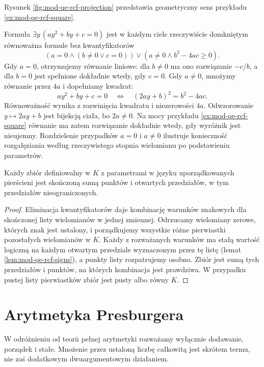 Rysunek \ref{fig:mod-qe-rcf-projection} przedstawia
geometryczny sens przykładu \ref{ex:mod-qe-rcf-square}.

\begin{przyklad}
\label{ex:mod-qe-rcf-quadratic}
Formuła $\exists y\,(ay^2+by+c=0)$ jest w każdym
ciele rzeczywiście domkniętym równoważna formule
bez kwantyfikatorów
\[
(a=0\land (b\ne0\lor c=0))
\lor(a\ne0\land b^2-4ac\geq0).
\]
Gdy $a=0$, otrzymujemy równanie liniowe: dla $b\ne0$
ma ono rozwiązanie $-c/b$, a dla $b=0$ jest spełnione
dokładnie wtedy, gdy $c=0$. Gdy $a\ne0$, mnożymy
równanie przez $4a$ i dopełniamy kwadrat:
\[
ay^2+by+c=0
\quad\Longleftrightarrow\quad
(2ay+b)^2=b^2-4ac.
\]
Równoważność wynika z rozwinięcia kwadratu i
niezerowości $4a$. Odwzorowanie $y\mapsto 2ay+b$
jest bijekcją ciała, bo $2a\ne0$. Na mocy przykładu
\ref{ex:mod-qe-rcf-square} równanie ma zatem
rozwiązanie dokładnie wtedy, gdy wyróżnik jest
nieujemny. Rozdzielenie przypadków $a=0$ i $a\ne0$
ilustruje konieczność rozgałęziania według rzeczywistego
stopnia wielomianu po podstawieniu parametrów.
\end{przyklad}

\begin{wniosek}
\label{cor:mod-qe-rcf-one-variable}
Każdy zbiór definiowalny w $K$ z parametrami w języku
uporządkowanych pierścieni jest skończoną sumą punktów
i otwartych przedziałów, w tym przedziałów nieograniczonych.
\end{wniosek}
\begin{proof}
Eliminacja kwantyfikatorów daje kombinację warunków
znakowych dla skończonej listy wielomianów w jednej
zmiennej. Odrzucamy wielomiany zerowe, których znak
jest ustalony, i porządkujemy wszystkie różne pierwiastki
pozostałych wielomianów w $K$. Każdy z rozważanych
warunków ma stałą wartość logiczną na każdym otwartym
przedziale wyznaczonym przez tę listę (lemat
\ref{lem:mod-qe-rcf-signs}), a punkty listy rozpatrujemy
osobno. Zbiór jest sumą tych przedziałów i punktów,
na których kombinacja jest prawdziwa. W przypadku
pustej listy pierwiastków zbiór jest pusty albo równy $K$.
\end{proof}

\section{Arytmetyka Presburgera}
W odróżnieniu od teorii pełnej arytmetyki rozważamy
wyłącznie dodawanie, porządek i stałe. Mnożenie przez
ustaloną liczbę całkowitą jest skrótem termu, nie zaś
dodatkowym dwuargumentowym działaniem.

